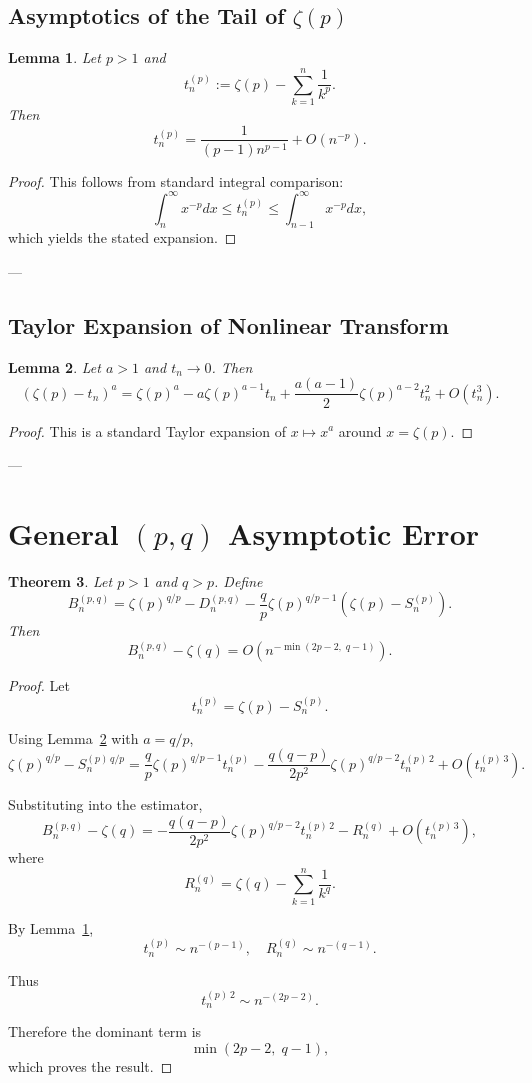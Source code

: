 \documentclass[11pt]{article}
\numberwithin{equation}{section}
\newtheorem{theorem}{Theorem}[section]
\newtheorem{lemma}[theorem]{Lemma}
\theoremstyle{definition}
\begin{document}
\subsection{Asymptotics of the Tail of $\zeta(p)$}

\begin{lemma}
\label{lem:tail}
Let $p>1$ and
\[
t_n^{(p)} := \zeta(p) - \sum_{k=1}^n \frac{1}{k^p}.
\]
Then
\[
t_n^{(p)} = \frac{1}{(p-1)n^{p-1}} + O(n^{-p}).
\]
\end{lemma}

\begin{proof}
This follows from standard integral comparison:
\[
\int_n^\infty x^{-p}dx \le t_n^{(p)} \le \int_{n-1}^\infty x^{-p}dx,
\]
which yields the stated expansion.
\end{proof}

---

\subsection{Taylor Expansion of Nonlinear Transform}

\begin{lemma}
\label{lem:taylor}
Let $a>1$ and $t_n \to 0$. Then
\[
(\zeta(p) - t_n)^a
=
\zeta(p)^a
- a\zeta(p)^{a-1} t_n
+ \frac{a(a-1)}{2}\zeta(p)^{a-2} t_n^2
+ O(t_n^3).
\]
\end{lemma}

\begin{proof}
This is a standard Taylor expansion of $x \mapsto x^a$ around $x=\zeta(p)$.
\end{proof}

---

\section{General $(p,q)$ Asymptotic Error}

\begin{theorem}
\label{thm:general}
Let $p>1$ and $q>p$. Define
\[
B_n^{(p,q)}
=
\zeta(p)^{q/p}
-
D_n^{(p,q)}
-
\frac{q}{p}\zeta(p)^{q/p-1}(\zeta(p)-S_n^{(p)}).
\]
Then
\[
B_n^{(p,q)} - \zeta(q)
=
O\!\left(n^{-\min(2p-2,\;q-1)}\right).
\]
\end{theorem}

\begin{proof}
Let
\[
t_n^{(p)} = \zeta(p) - S_n^{(p)}.
\]

Using Lemma~\ref{lem:taylor} with $a=q/p$,
\[
\zeta(p)^{q/p} - S_n^{(p)\,q/p}
=
\frac{q}{p}\zeta(p)^{q/p-1} t_n^{(p)}
-
\frac{q(q-p)}{2p^2}\zeta(p)^{q/p-2} t_n^{(p)\,2}
+ O(t_n^{(p)\,3}).
\]

Substituting into the estimator,
\[
B_n^{(p,q)} - \zeta(q)
=
-\frac{q(q-p)}{2p^2}\zeta(p)^{q/p-2} t_n^{(p)\,2}
- R_n^{(q)} + O(t_n^{(p)\,3}),
\]
where
\[
R_n^{(q)} = \zeta(q) - \sum_{k=1}^n \frac{1}{k^q}.
\]

By Lemma~\ref{lem:tail},
\[
t_n^{(p)} \sim n^{-(p-1)}, \quad
R_n^{(q)} \sim n^{-(q-1)}.
\]

Thus
\[
t_n^{(p)\,2} \sim n^{-(2p-2)}.
\]

Therefore the dominant term is
\[
\min(2p-2,\;q-1),
\]
which proves the result.
\end{proof}
\end{document}
